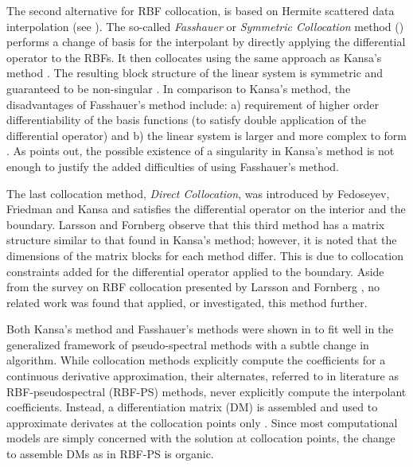 \documentclass[11pt]{report}
\begin{document}
{The second alternative for RBF collocation, is based on Hermite scattered 
data interpolation (see \cite{Wu1992}). The so-called \emph{Fasshauer} or \emph{Symmetric Collocation} method (\cite{Fasshauer1997}) 
performs a change of basis for the interpolant by directly applying the differential operator to the RBFs. It then collocates using the same approach as Kansa's method \cite{Stevens2009b, Larsson2003}. The resulting block structure of the linear system is symmetric and 
guaranteed to be non-singular \cite{Fasshauer1997}. In comparison to Kansa's method, the disadvantages of Fasshauer's method 
include: a) requirement of higher order differentiability of the basis functions (to satisfy double application of the differential operator)
and b) the linear system is larger and more complex to form
 \cite{Fasshauer2007}. As \cite{Hon2001} points out, 
the possible existence of a singularity in Kansa's method is not enough to justify the added difficulties of using Fasshauer's 
method.


The last collocation method, \emph{Direct Collocation}, was introduced by Fedoseyev, Friedman and Kansa
 \cite{Fedoseyev2002} and satisfies the differential operator on the interior and the boundary. Larsson and Fornberg \cite{Larsson2003} observe that this third method has a matrix structure similar to that found in Kansa's method; however, it is noted that the dimensions of the matrix blocks for each method differ. This is due to collocation constraints added for 
the differential operator applied to the boundary. Aside from the survey on RBF collocation presented by Larsson and Fornberg \cite{Larsson2003}, no related 
work was found that applied, or investigated, this method further.  

Both Kansa's method and Fasshauer's methods were shown in \cite{Fasshauer2006} to fit well in the generalized framework of pseudo-spectral methods with a subtle change in algorithm. While collocation methods explicitly compute the coefficients for a continuous derivative approximation, their alternates, referred to in literature as RBF-pseudospectral (RBF-PS) methods, never explicitly compute the interpolant coefficients. Instead, a differentiation matrix (DM) is assembled and used to approximate derivates at the collocation points only \cite{FasshauerZhang2007}. Since most computational models are simply concerned with the solution at collocation points, the change to assemble DMs as in RBF-PS is organic. 


}
\end{document}
